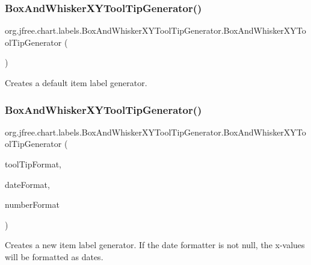 \subsubsection{\texorpdfstring{Box\+And\+Whisker\+X\+Y\+Tool\+Tip\+Generator()}{BoxAndWhiskerXYToolTipGenerator()}\hspace{0.1cm}{\footnotesize\ttfamily [1/2]}}
{\footnotesize\ttfamily org.\+jfree.\+chart.\+labels.\+Box\+And\+Whisker\+X\+Y\+Tool\+Tip\+Generator.\+Box\+And\+Whisker\+X\+Y\+Tool\+Tip\+Generator (\begin{DoxyParamCaption}{ }\end{DoxyParamCaption})}

Creates a default item label generator. \mbox{\label{classorg_1_1jfree_1_1chart_1_1labels_1_1_box_and_whisker_x_y_tool_tip_generator_ac43da4c4d4184c5d7de4e12a2ba6eb2f}} 
\subsubsection{\texorpdfstring{Box\+And\+Whisker\+X\+Y\+Tool\+Tip\+Generator()}{BoxAndWhiskerXYToolTipGenerator()}\hspace{0.1cm}{\footnotesize\ttfamily [2/2]}}
{\footnotesize\ttfamily org.\+jfree.\+chart.\+labels.\+Box\+And\+Whisker\+X\+Y\+Tool\+Tip\+Generator.\+Box\+And\+Whisker\+X\+Y\+Tool\+Tip\+Generator (\begin{DoxyParamCaption}\item[{String}]{tool\+Tip\+Format,  }\item[{Date\+Format}]{date\+Format,  }\item[{Number\+Format}]{number\+Format }\end{DoxyParamCaption})}

Creates a new item label generator. If the date formatter is not {\ttfamily null}, the x-\/values will be formatted as dates.


